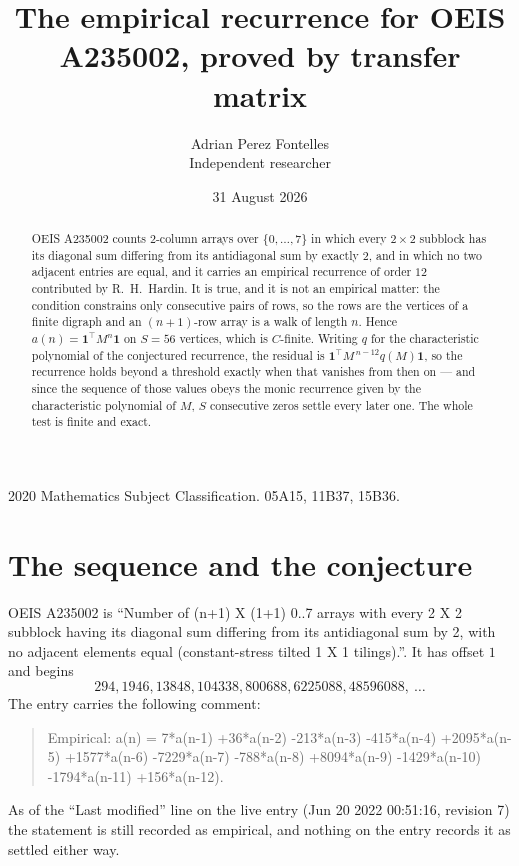 \documentclass[11pt,a4paper]{article}
\title{The empirical recurrence for OEIS A235002, proved by transfer matrix}
\author{Adrian Perez Fontelles\\ \small Independent researcher}
\date{31 August 2026}
\theoremstyle{plain}
\theoremstyle{definition}
\begin{document}
\maketitle

\begin{abstract}
OEIS A235002 counts $2$-column arrays over $\{0,\dots,7\}$ in which every
$2\times2$ subblock has its diagonal sum differing from its antidiagonal sum by
exactly $2$, and in which no two adjacent entries are equal, and it
carries an empirical recurrence of order $12$ contributed by R.~H.~Hardin. It is true,
and it is not an empirical matter: the condition constrains only consecutive pairs of rows,
so the rows are the vertices of a finite digraph and an $(n+1)$-row array is a walk of
length $n$. Hence $a(n)=\mathbf{1}^{\!\top}M^{n}\mathbf{1}$ on $S=56$ vertices, which
is $C$-finite. Writing $q$ for the characteristic polynomial of the conjectured recurrence,
the residual is $\mathbf{1}^{\!\top}M^{\,n-12}q(M)\mathbf{1}$, so the recurrence
holds beyond a threshold exactly when that vanishes from then on --- and since the sequence
of those values obeys the monic recurrence given by the characteristic polynomial of $M$,
$S$ consecutive zeros settle every later one. The whole test is finite and exact.
\end{abstract}

\noindent\small 2020 Mathematics Subject Classification. 05A15, 11B37, 15B36.\normalsize

\section{The sequence and the conjecture}

OEIS A235002 is ``Number of (n+1) X (1+1) 0..7 arrays with every 2 X 2 subblock having its diagonal sum differing from its antidiagonal sum by 2, with no adjacent elements equal (constant-stress tilted 1 X 1 tilings).''. It has offset
$1$ and begins
\[
294, 1946, 13848, 104338, 800688, 6225088, 48596088,\ \dots
\]
The entry carries the following comment:
\begin{quote}\small
Empirical: a(n) = 7*a(n-1) +36*a(n-2) -213*a(n-3) -415*a(n-4) +2095*a(n-5) +1577*a(n-6) -7229*a(n-7) -788*a(n-8) +8094*a(n-9) -1429*a(n-10) -1794*a(n-11) +156*a(n-12).
\end{quote}
As of the ``Last modified'' line on the live entry (Jun 20 2022 00:51:16, revision 7) the statement is
still recorded as empirical, and nothing on the entry records it as settled either way.
\end{document}
